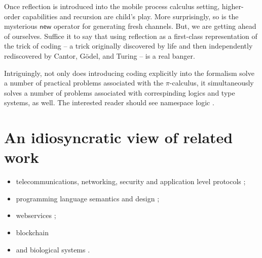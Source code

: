 Once reflection is introduced into the mobile process calculus
setting, higher-order capabilities and recursion are child's
play. More surprisingly, so is the mysterious $\mathsf{new}$ operator
for generating fresh channels. But, we are getting ahead of
ourselves. Suffice it to say that using reflection as a first-class
representation of the trick of coding -- a trick originally discovered
by life and then independently rediscovered by Cantor, G\"odel, and
Turing -- is a real banger.

Intriguingly, not only does introducing coding explicitly into the
formalism solve a number of practical problems associated with the
$\pi$-calculus, it simultaneously solves a number of problems
associated with correspinding logics and type systems, as well. The
interested reader should see namespace logic
\cite{DBLP:conf/tgc/MeredithR05}.

\section{An idiosyncratic view of related work}

\begin{itemize}
\item telecommunications, networking, security and application level protocols
\cite{DBLP:conf/popl/AbadiB02} 
\cite{DBLP:journals/tcs/AbadiB03} 
\cite{DBLP:conf/epew/BrownLM05} 
\cite{DBLP:conf/fossacs/LaneveZ05}; 
\item programming language semantics and design
\cite{DBLP:conf/epew/BrownLM05}
\cite{djoin}
\cite{DBLP:conf/afp/FournetFMS02}
\cite{DBLP:journals/toplas/SewellWU10};
\item webservices
\cite{DBLP:conf/epew/BrownLM05}
\cite{DBLP:conf/fossacs/LaneveZ05}
\cite{DBLP:conf/wise/Meredith03};
\item{blockchain}
  \cite{meredith_2017}
\item and biological systems
\cite{DBLP:conf/cmsb/Cardelli04}
\cite{DBLP:conf/esop/DanosL03}
\cite{DBLP:conf/psb/RegevSS01}
\cite{DBLP:journals/ipl/PriamiRSS01}.
\end{itemize}


